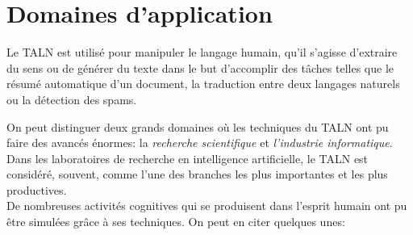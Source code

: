 \section{Domaines d'application}
Le TALN est utilisé pour manipuler le langage humain, qu'il s'agisse d'extraire du sens ou de générer du texte dans le but d'accomplir des tâches telles que le résumé automatique d'un document, la traduction entre deux langages naturels ou la détection des spams.

On peut distinguer deux grands domaines où les techniques du TALN ont pu faire des avancés énormes: la \emph{recherche scientifique} et \emph{l'industrie informatique}.\\
Dans les laboratoires de recherche en intelligence artificielle, le TALN est considéré, souvent, comme l'une des branches les plus importantes et les plus productives.\\ 
De nombreuses activités cognitives qui se produisent dans l'esprit humain ont pu être simulées grâce à ses techniques.
On peut en citer quelques unes: 
